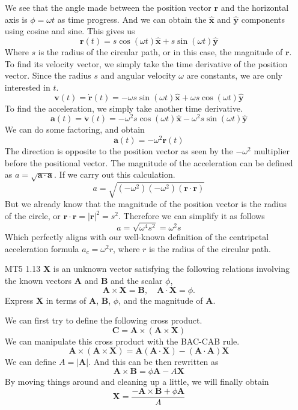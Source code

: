 \documentclass[12pt]{article}
\newcommand{\paren}[1]{\left( #1 \right)}
\newcommand{\abso}[1]{\left|#1 \right|}
\newcommand{\unx}{\hat{\mathbf{x}}}
\newcommand{\uny}{\hat{\mathbf{y}}}
\begin{document}
\begin{enumerate}
        We see that the angle made between the position vector $\mathbf{r}$ and the horizontal axis is $\phi = \omega t$ as time progress. And we can obtain the $\unx$ and $\uny$ components using cosine and sine. This gives us 
        \[
        \mathbf{r}(t) = s \cos(\omega t)\unx +  s \sin(\omega t)\uny
        \]
        Where $s$ is the radius of the circular path, or in this case, the magnitude of $\mathbf{r}$. To find its velocity vector, we simply take the time derivative of the position vector. Since the radius $s$ and angular velocity $\omega$ are constants, we are only interested in $t$. 
        \[
        \mathbf{v}(t) = \dot{\mathbf{r}}(t) = -\omega s\sin(\omega t)\unx + \omega s\cos(\omega t)\uny
        \]
        To find the acceleration, we simply take another time derivative.
        \[
        \mathbf{a}(t) = \dot{\mathbf{v}}(t) = -\omega^2s\cos(\omega t) \unx - \omega^2 s\sin(\omega t)\uny
        \]
        We can do some factoring, and obtain
        \[
        \mathbf{a}(t) = -\omega^2 \mathbf{r}(t)
        \]
        The direction is opposite to the position vector as seen by the $-\omega^2$ multiplier before the positional vector. The magnitude of the acceleration can be defined as $a = \sqrt{\mathbf{a}\cdot \mathbf{a}}$. If we carry out this calculation.
        \[
        a = \sqrt{\paren{-\omega^2}\paren{-\omega^2}\paren{\mathbf{r}\cdot\mathbf{r}}}
        \]
        But we already know that the magnitude of the position vector is the radius of the circle, or $\mathbf{r}\cdot\mathbf{r}=\abso{\mathbf{r}}^2=s^2$. Therefore we can simplify it as follows
        \[
        a = \sqrt{\omega^4s^2} = \omega^2s
        \]
        Which perfectly aligns with our well-known definition of the centripetal acceleration formula $a_c = \omega^2 r$, where $r$ is the radius of the circular path. 

        \item[MT5 1.13] \textbf{X} is an unknown vector satisfying the following relations involving the known vectors \textbf{A} and \textbf{B} and the scalar \( \phi \),
        \[
        \mathbf{A} \times \mathbf{X} = \mathbf{B}, \quad \mathbf{A} \cdot \mathbf{X} = \phi.
        \]
        Express \textbf{X} in terms of \textbf{A}, \textbf{B}, \( \phi \), and the magnitude of \textbf{A}.

        We can first try to define the following cross product.
        \[
        \mathbf{C} = \mathbf{A}\times\paren{\mathbf{A}\times \mathbf{X}}
        \]
        We can manipulate this cross product with the BAC-CAB rule.
        \[
        \mathbf{A}\times\paren{\mathbf{A}\times \mathbf{X}} = \mathbf{A}\paren{\mathbf{A}\cdot\mathbf{X}} - \paren{\mathbf{A}\cdot\mathbf{A}}\mathbf{X}
        \]
        We can define $A = \abso{\mathbf{A}}$. And this can be then rewritten as
        \[
        \mathbf{A}\times\mathbf{B} = \phi\mathbf{A}- A\mathbf{X}
        \]
        By moving things around and cleaning up a little, we will finally obtain
        \[
        \mathbf{X} = \frac{-\mathbf{A}\times\mathbf{B} + \phi\mathbf{A}}{A}
        \]


\end{enumerate}
\end{document}
